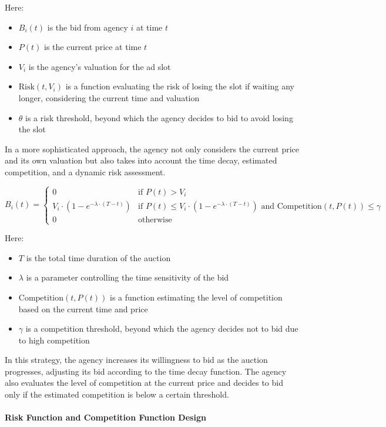 Here:
\begin{itemize}
    \item \( B_i(t) \) is the bid from agency \( i \) at time \( t \)
    \item \( P(t) \) is the current price at time \( t \)
    \item \( V_i \) is the agency’s valuation for the ad slot
    \item \( \text{Risk}(t, V_i) \) is a function evaluating the risk of losing the slot if waiting any longer, considering the current time and valuation
    \item \( \theta \) is a risk threshold, beyond which the agency decides to bid to avoid losing the slot
\end{itemize}

In a more sophisticated approach, the agency not only considers the current price and its own valuation but also takes into account the time decay, estimated competition, and a dynamic risk assessment.

\[
B_i(t) = 
\begin{cases} 
0 & \text{if } P(t) > V_i \\
V_i \cdot \left(1 - e^{-\lambda \cdot (T-t)}\right) & \text{if } P(t) \leq V_i \cdot \left(1 - e^{-\lambda \cdot (T-t)}\right) \text{ and } \text{Competition}(t, P(t)) \leq \gamma \\
0 & \text{otherwise}
\end{cases}
\]

Here:
\begin{itemize}
    \item \( T \) is the total time duration of the auction
    \item \( \lambda \) is a parameter controlling the time sensitivity of the bid
    \item \( \text{Competition}(t, P(t)) \) is a function estimating the level of competition based on the current time and price
    \item \( \gamma \) is a competition threshold, beyond which the agency decides not to bid due to high competition
\end{itemize}

In this strategy, the agency increases its willingness to bid as the auction progresses, adjusting its bid according to the time decay function. The agency also evaluates the level of competition at the current price and decides to bid only if the estimated competition is below a certain threshold.

\paragraph{Risk Function and Competition Function Design}

